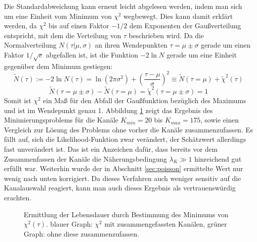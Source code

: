     Die Standardabweichung kann erneut leicht abgelesen werden, indem man sich um eine Einheit vom Minimum von $\chi^2$ wegbewegt. Dies kann damit erklärt werden, da $\chi^2$ bis auf einen Faktor $-1/2$ dem Exponenten der Gaußverteilung entspricht, mit dem die Verteilung von $\tau$ beschrieben wird. Da die Normalverteilung $N(\tau|\mu,\sigma)$ an ihren Wendepunkten $\tau = \mu \pm \sigma$ gerade um einen Faktor $1/\sqrt{e}$ abgefallen ist, ist die Funktion $-2 \ln N$ gerade um eine Einheit gegenüber dem Minimum gestiegen:
    	\begin{equation}
    	       \tilde{N}(\tau) := -2 \ln N(\tau) = \ln(2\pi\sigma^2)  + \left(\frac{\tau - \mu}{\sigma}\right)^2 \equiv \tilde{N}(\tau = \mu) + \tilde{\chi}^2(\tau)	
    	\end{equation}
    	\begin{equation}
    	    	\tilde{N}(\tau = \mu \pm \sigma) - \tilde{N}(\tau = \mu) = \tilde{\chi}^2(\tau = \mu \pm \sigma) = 1 	
    	 \end{equation}
    Somit ist $\chi^2$ ein Maß für den Abfall der Gaußfunktion bezüglich des Maximums und ist im Wendepunkt genau 1. Abbildung \ref{fig:LDgauss} zeigt  das Ergebnis des Minimierungsproblems für die Kanäle $K_{min} = 20$ bis $K_{max} = 175$, sowie einen Vergleich zur Lösung des Problems ohne vorher die Kanäle zusammenzufassen. Es fällt auf, sich die Likelihood-Funktion zwar verändert, der Schätzwert allerdings fast unverändert ist. Das ist ein Anzeichen dafür, dass bereits vor dem Zusammenfassen der Kanäle die Näherungsbedingung $\lambda_K \gg 1$ hinreichend gut erfüllt war. Weiterhin wurde der in Abschnitt \ref{sec:poisson} ermittelte Wert nur wenig nach unten korrigiert. Da dieses Verfahren auch weniger sensitiv auf die Kanalauswahl reagiert, kann man auch dieses Ergebnis als vertrauenswürdig erachten.
   		\begin{figure}[hp]
      		   			\centering
      		   			\captionsetup{justification=centering}
      		   			\caption{Ermittlung der Lebensdauer durch Bestimmung des Minimums von $\chi^2(\tau)$. blauer Graph: $\chi^2$ mit zusammengefassten Kanälen, grüner Graph: ohne diese zusammenzufassen.}
      		   			\label{fig:LDgauss}	
      	\end{figure}
    
      		
      		